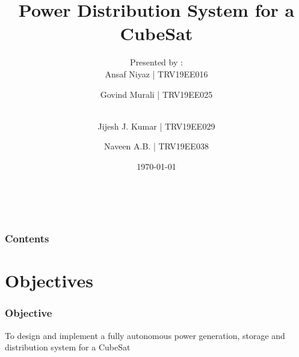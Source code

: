 \documentclass[aspectratio=169]{beamer}
\begin{document}
	\title{Power Distribution System for a CubeSat}
	
	\subtitle{}
	
	
	\author{Presented by :\\Ansaf Niyaz | TRV19EE016  \and Govind Murali | TRV19EE025  \and \\Jijesh J. Kumar | TRV19EE029  \and Naveen A.B. | TRV19EE038}
	
	\date{\today}
	
	
	{%
		\hbox{%
			\hbox{\insertslidenavigationsymbol}
			\hbox{\insertframenavigationsymbol}
			\hbox{\insertsubsectionnavigationsymbol}
			\hbox{\insertsectionnavigationsymbol}
			\hbox{\insertdocnavigationsymbol}
			\hbox{\insertbackfindforwardnavigationsymbol}}%
	}
	\begin{frame}[plain]
		\maketitle
	\end{frame}
	
	
	\begin{frame}
		\frametitle{Contents}
		
		
		
		
		\tableofcontents
	\end{frame}
	
	
	
	\section{Objectives}
	\begin{frame}
		
		\frametitle{Objective}
		To design and implement a fully autonomous power generation, storage and distribution system for a CubeSat 
		
		
		
	\end{frame}
	
	
	
	
	
	
			
\end{document}
